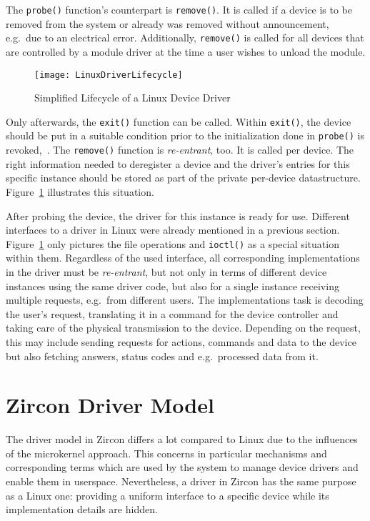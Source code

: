 The \texttt{probe()} function's counterpart is \texttt{remove()}.
It is called if a device is to be removed from the system or already was removed without announcement, e.g.\ due to an electrical error.
Additionally, \texttt{remove()} is called for all devices that are controlled by a module driver at the time a user wishes to unload the module.
%
\begin{figure} [t]
    \centering
    \texttt{[image: LinuxDriverLifecycle]}
    \caption{Simplified Lifecycle of a Linux Device Driver}
    \label{pic:linux-lifecycle}
\end{figure}
%
%
Only afterwards, the \texttt{exit()} function can be called.
Within \texttt{exit()}, the device should be put in a suitable condition prior to the initialization done in \texttt{probe()} is revoked\cite{lfd430},~\cite{quade2016Linux}.
The \texttt{remove()} function is \textit{re-entrant}, too.
It is called per device.
The right information needed to deregister a device and the driver's entries for this specific instance should be stored as part of the private per-device datastructure.
Figure~\ref{pic:linux-lifecycle} illustrates this situation.

After probing the device, the driver for this instance is ready for use.
Different interfaces to a driver in Linux were already mentioned in a previous section.
Figure~\ref{pic:linux-lifecycle} only pictures the file operations and \texttt{ioctl()} as a special situation within them.
Regardless of the used interface, all corresponding implementations in the driver must be \textit{re-entrant}, but not only in terms of different device instances using the same driver code, but also for a single instance receiving multiple requests, e.g.\ from different users.
The implementations task is decoding the user's request, translating it in a command for the device controller and taking care of the physical transmission to the device.
Depending on the request, this may include sending requests for actions, commands and data to the device but also fetching answers, status codes and e.g.\ processed data from it\cite{quade2016Linux}.


\section{Zircon Driver Model}
The driver model in Zircon differs a lot compared to Linux due to the influences of the microkernel approach.
This concerns in particular mechanisms and corresponding terms which are used by the system to manage device drivers and enable them in userspace.
Nevertheless, a driver in Zircon has the same purpose as a Linux one: providing a uniform interface to a specific device while its implementation details are hidden\cite{zircon-ddk-gettingstarted}. 


